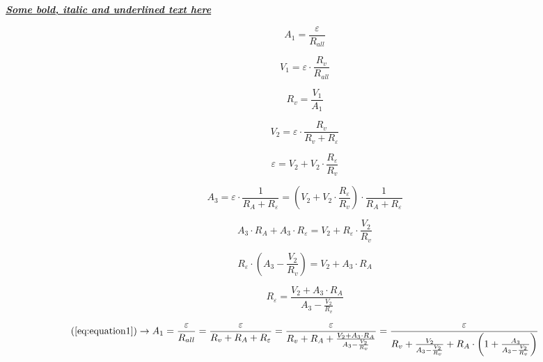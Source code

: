 \documentclass[12pt]{article}
\begin{document}
    \underline{\textit{\textbf{Some bold, italic and underlined text here}}}

    \begin{equation}
        A_1 = \frac{\varepsilon}{R_{all}}\label{eq:equation1}
    \end{equation}

    \begin{equation}
        V_1 = \varepsilon \cdot \frac{R_v}{R_{all}}\label{eq:equation2}
    \end{equation}

    \begin{equation*}
        R_v = \frac{V_1}{A_1}
    \end{equation*}

    \begin{equation}
        V_2 = \varepsilon \cdot \frac{R_v}{R_v + R_\varepsilon}\label{eq:equation3}
    \end{equation}

    \begin{equation*}
        \varepsilon = V_2 + V_2 \cdot \frac{R_\varepsilon}{R_v}
    \end{equation*}

    \begin{equation}
        A_3 = \varepsilon \cdot \frac{1}{R_A + R_\varepsilon} = \left(V_2 + V_2 \cdot \frac{R_\varepsilon}{R_v}\right) \cdot \frac{1}{R_A + R_\varepsilon} \label{eq:equation4}
    \end{equation}

    \begin{equation*}
        A_3 \cdot R_A + A_3 \cdot R_\varepsilon = V_2 + R_\varepsilon \cdot \frac{V_2}{R_v}
    \end{equation*}

    \begin{equation*}
        R_\varepsilon \cdot \left( A_3 - \frac{V_2}{R_v} \right) = V_2 + A_3 \cdot R_A
    \end{equation*}

    \begin{equation*}
        R_\varepsilon = \frac{V_2 + A_3 \cdot R_A}{A_3 - \frac{V_2}{R_v}}
    \end{equation*}

    \begin{equation*}
        \left(\ref{eq:equation1} \right) \rightarrow A_1 = \frac{\varepsilon}{R_{all}} = \frac{\varepsilon}{R_v + R_A + R_\varepsilon} = \frac{\varepsilon}{R_v + R_A + \frac{V_2 + A_3 \cdot R_A}{A_3 - \frac{V_2}{R_v}}} = \frac{\varepsilon}{R_v + \frac{V_2}{A_3 - \frac{V_2}{R_v}} + R_A \cdot \left( 1 + \frac{A_3}{A_3 - \frac{V_2}{R_v}} \right)}
    \end{equation*}
\end{document}
